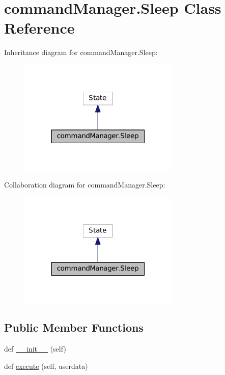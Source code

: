 \hypertarget{classcommandManager_1_1Sleep}{}\section{command\+Manager.\+Sleep Class Reference}
\label{classcommandManager_1_1Sleep}


Inheritance diagram for command\+Manager.\+Sleep\+:\nopagebreak
\begin{figure}[H]
\begin{center}
\leavevmode
\includegraphics[width=217pt]{classcommandManager_1_1Sleep__inherit__graph}
\end{center}
\end{figure}


Collaboration diagram for command\+Manager.\+Sleep\+:\nopagebreak
\begin{figure}[H]
\begin{center}
\leavevmode
\includegraphics[width=217pt]{classcommandManager_1_1Sleep__coll__graph}
\end{center}
\end{figure}
\subsection*{Public Member Functions}
\begin{DoxyCompactItemize}
\item 
def \hyperlink{classcommandManager_1_1Sleep_aa31bb1cc360e9bb1d723eaf953295268}{\+\_\+\+\_\+init\+\_\+\+\_\+} (self)
\item 
def \hyperlink{classcommandManager_1_1Sleep_a01a1b33499ec3c862bed42a6258b0f12}{execute} (self, userdata)
\end{DoxyCompactItemize}
